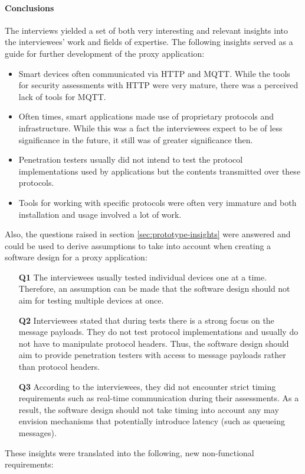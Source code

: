 \paragraph{Conclusions}
The interviews yielded a set of both very interesting and relevant insights into the interviewees' work and fields of expertise. The following insights served as a guide for further development of the proxy application:
\begin{itemize}
    \item Smart devices often communicated via \ac{HTTP} and \ac{MQTT}. While the tools for security assessments with \ac{HTTP} were very mature, there was a perceived lack of tools for \ac{MQTT}.
    \item Often times, smart applications made use of proprietary protocols and infrastructure. While this was a fact the interviewees expect to be of less significance in the future, it still was of greater significance then.
    \item Penetration testers usually did not intend to test the protocol implementations used by applications but the contents transmitted over these protocols.
    \item Tools for working with specific protocols were often very immature and both installation and usage involved a lot of work.
\end{itemize}
Also, the questions raised in section \ref{sec:prototype-insights} were answered and could be used to derive assumptions to take into account when creating a software design for a proxy application:
\begin{enumerate} %
    \item [\textbf{Q1}] The interviewees usually tested individual devices one at a time.
          Therefore, an assumption can be made that the software design should not aim for testing multiple devices at once.
    \item [\textbf{Q2}] Interviewees stated that during tests there is a strong focus on the message payloads. They do not test protocol implementations and usually do not have to manipulate protocol headers. Thus, the software design should aim to provide penetration testers with access to message payloads rather than protocol headers.
    \item [\textbf{Q3}] According to the interviewees, they did not encounter strict timing requirements such as real-time communication during their assessments. As a result, the software design should not take timing into account any may envision mechanisms that potentially introduce latency (such as queueing messages).
\end{enumerate}
These insights were translated into the following, new non-functional requirements:

